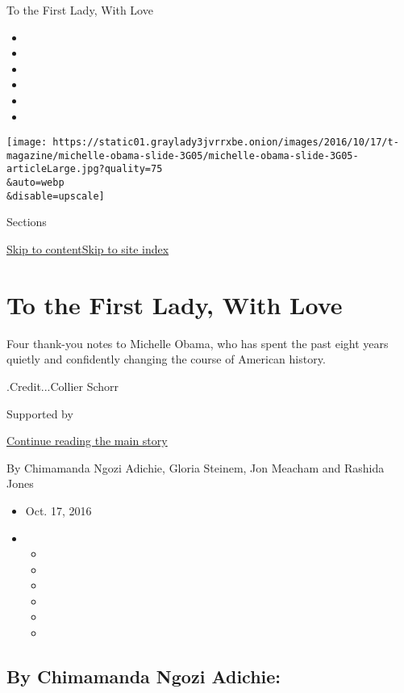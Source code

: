 To the First Lady, With Love

\begin{itemize}
\item
\item
\item
\item
\item
\item
\end{itemize}

\texttt{[image: https://static01.graylady3jvrrxbe.onion/images/2016/10/17/t-magazine/michelle-obama-slide-3G05/michelle-obama-slide-3G05-articleLarge.jpg?quality=75\\\&auto=webp\\\&disable=upscale]}

Sections

\protect\hyperlink{site-content}{Skip to
content}\protect\hyperlink{site-index}{Skip to site index}

\hypertarget{to-the-first-lady-with-love}{%
\section{To the First Lady, With
Love}\label{to-the-first-lady-with-love}}

Four thank-you notes to Michelle Obama, who has spent the past eight
years quietly and confidently changing the course of American history.

.Credit...Collier Schorr

Supported by

\protect\hyperlink{after-sponsor}{Continue reading the main story}

By Chimamanda Ngozi Adichie, Gloria Steinem, Jon Meacham and Rashida
Jones

\begin{itemize}
\item
  Oct. 17, 2016
\item
  \begin{itemize}
  \item
  \item
  \item
  \item
  \item
  \item
  \end{itemize}
\end{itemize}

\hypertarget{by-chimamanda-ngozi-adichie}{%
\subsection{By Chimamanda Ngozi
Adichie:}\label{by-chimamanda-ngozi-adichie}}

